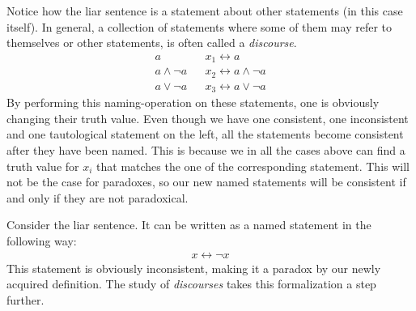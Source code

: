 Notice how the liar sentence is a statement about other statements (in this case itself).
In general, a collection of statements where some of them may refer to themselves or other statements, is often called a \textit{discourse}\cite{synthese-pdl}.
\begin{align}
  a               && x_1 \leftrightarrow a\\
  a \wedge \neg a && x_2 \leftrightarrow a \wedge \neg a\\
  a \vee \neg a   && x_3 \leftrightarrow a \vee \neg a
\end{align}
By performing this naming-operation on these statements, one is obviously changing their truth value.
Even though we have one consistent, one inconsistent and one tautological statement on the left, all the statements become consistent after they have been named.
This is because we in all the cases above can find a truth value for $x_i$ that matches the one of the corresponding statement.
This will not be the case for paradoxes, so our new named statements will be consistent if and only if they are not paradoxical.

Consider the liar sentence.  It can be written as a named statement in the following way:
\begin{align}
  x \leftrightarrow \neg x
\end{align}
This statement is obviously inconsistent, making it a paradox by our newly acquired definition.  The study of \textit{discourses} takes this formalization a step further.
